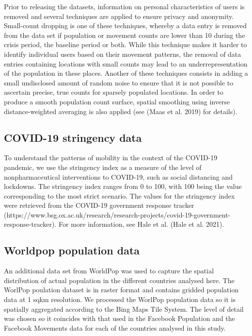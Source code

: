 \documentclass[
  10pt,
  letterpaper,
  DIV=11,
  numbers=noendperiod]{scrartcl}
\begin{document}
Prior to releasing the datasets, information on personal characteristics
of users is removed and several techniques are applied to ensure privacy
and anonymity. Small-count dropping is one of these techniques, whereby
a data entry is removed from the data set if population or movement
counts are lower than 10 during the crisis period, the baseline period
or both. While this technique makes it harder to identify individual
users based on their movement patterns, the removal of data entries
containing locations with small counts may lead to an
underrepresentation of the population in these places. Another of these
techniques consists in adding a small undisclosed amount of random noise
to ensure that it is not possible to ascertain precise, true counts for
sparsely populated locations. In order to produce a smooth population
count surface, spatial smoothing using inverse distance-weighted
averaging is also applied (see (Maas et al. 2019) for details).

\hypertarget{covid-19-stringency-data}{%
\subsection{COVID-19 stringency data}\label{covid-19-stringency-data}}

To understand the patterns of mobility in the context of the COVID-19
pandemic, we use the stringency index as a measure of the level of
nonpharmaceutical interventions to COVID-19, such as social distancing
and lockdowns. The stringency index ranges from 0 to 100, with 100 being
the value corresponding to the most strict scenario. The values for the
stringency index were retrieved from the COVID-19 government response
tracker
(https://www.bsg.ox.ac.uk/research/research-projects/covid-19-government-response-tracker).
For more information, see Hale et al. (Hale et al. 2021).

\hypertarget{worldpop-population-data}{%
\subsection{Worldpop population data}\label{worldpop-population-data}}

An additional data set from WorldPop was used to capture the spatial
distribution of actual population in the different countries analysed
here. The WorlPop poulation dataset is in raster format and contains
gridded population data at 1 sqkm resolution. We processed the WorlPop
population data so it is spatially aggregated according to the Bing Maps
Tile System. The level of detail was chosen so it coincides with that
used in the Facebook Population and the Facebook Movements data for each
of the countries analysed in this study.
\end{document}
